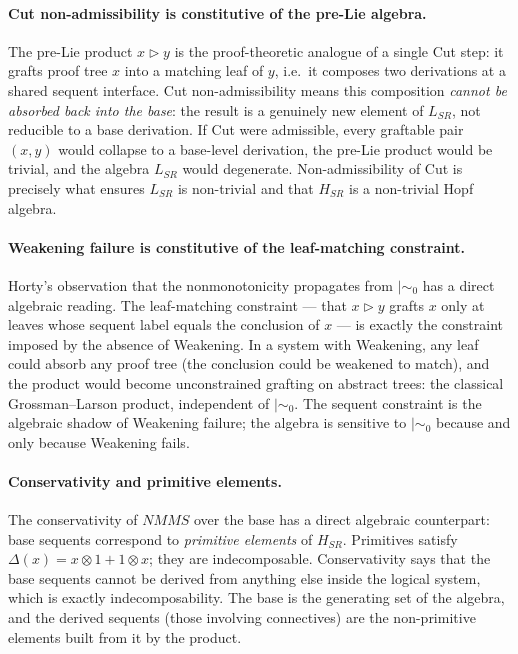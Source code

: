 \documentclass[a4paper,11pt]{report}
\newcommand{\mszero}{\mathrel{\mid\!\sim_{0}}}
\begin{document}
\paragraph{Cut non-admissibility is constitutive of the pre-Lie algebra.}
The pre-Lie product $x \triangleright y$ is the proof-theoretic analogue of a single Cut
step: it grafts proof tree $x$ into a matching leaf of $y$, i.e.\ it composes two
derivations at a shared sequent interface. Cut non-admissibility means this composition
\emph{cannot be absorbed back into the base}: the result is a genuinely new element of
$L_{SR}$, not reducible to a base derivation. If Cut were admissible, every graftable
pair $(x, y)$ would collapse to a base-level derivation, the pre-Lie product would be
trivial, and the algebra $L_{SR}$ would degenerate. Non-admissibility of Cut is precisely
what ensures $L_{SR}$ is non-trivial and that $H_{SR}$ is a non-trivial Hopf algebra.

\paragraph{Weakening failure is constitutive of the leaf-matching constraint.}
Horty's observation that the nonmonotonicity propagates from $\mszero$ has a direct
algebraic reading. The leaf-matching constraint --- that $x \triangleright y$ grafts $x$
only at leaves whose sequent label equals the conclusion of $x$ --- is exactly the
constraint imposed by the absence of Weakening. In a system with Weakening, any leaf
could absorb any proof tree (the conclusion could be weakened to match), and the product
would become unconstrained grafting on abstract trees: the classical Grossman--Larson
product, independent of $\mszero$. The sequent constraint is the algebraic shadow of
Weakening failure; the algebra is sensitive to $\mszero$ because and only because
Weakening fails.

\paragraph{Conservativity and primitive elements.}
The conservativity of $\mathit{NMMS}$ over the base has a direct algebraic counterpart:
base sequents correspond to \emph{primitive elements} of $H_{SR}$. Primitives satisfy
$\Delta(x) = x \otimes 1 + 1 \otimes x$; they are indecomposable. Conservativity says
that the base sequents cannot be derived from anything else inside the logical system,
which is exactly indecomposability. The base is the generating set of the algebra, and
the derived sequents (those involving connectives) are the non-primitive elements built
from it by the product.
\end{document}
